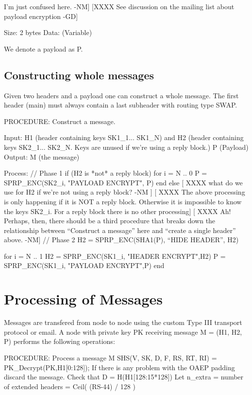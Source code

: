      I'm just confused here. -NM]
[XXXX See discussion on the mailing list about payload encryption -GD]

Size:   2 bytes
Data:   (Variable)

We denote a payload as P.

\subsection{Constructing whole messages}

Given two headers and a payload one can construct a whole
message. The first header (main) must always contain a last subheader
with routing type SWAP.  

PROCEDURE: Construct a message.

Input: H1 (header containing keys SK1_1... SK1_N)
       and H2 (header containing keys SK2_1... SK2_N.  Keys are unused
            if we're using a reply block.)
       P (Payload)
Output: M (the message)

Process:
	// Phase 1
	if (H2 is *not* a reply block)
		for i = N .. 0
	            P = SPRP_ENC(SK2_i, "PAYLOAD ENCRYPT", P)
		end
        else
           [ XXXX what do we use for H2 if we're not using a reply
	           block? -NM ]
	   [ XXXX The above processing is only happening if it is NOT
	a reply block. Otherwise it is impossible to know the keys
	SK2_i. For a reply block there is no other processing]
           [ XXXX Ah!  Perhaps, then, there should be a third
	          procedure that breaks down the relationship between
                  ``Construct a message'' here and ``create a single header''
                  above. -NM]
	// Phase 2
	H2 = SPRP_ENC(SHA1(P), ``HIDE HEADER'', H2)

	for i = N .. 1
		H2 = SPRP_ENC(SK1_i, "HEADER ENCRYPT",H2)
		P = SPRP_ENC(SK1_i, "PAYLOAD ENCRYPT",P)
	end

\section{Processing of Messages}

Messages are transfered from node to node using the custom Type III
transport protocol or email.  A node with private key PK receiving
message M = (H1, H2, P) performs the following operations:

PROCEDURE: Process a message M
	SHS(V, SK, D, F, RS, RT, RI) = PK_Decrypt(PK,H1[0:128]);
        If there is any problem with the OAEP padding discard the message.
        Check that D = H(H1[128:15*128])
        Let n_extra = number of extended headers = Ceil( (RS-44) / 128 )
                  
